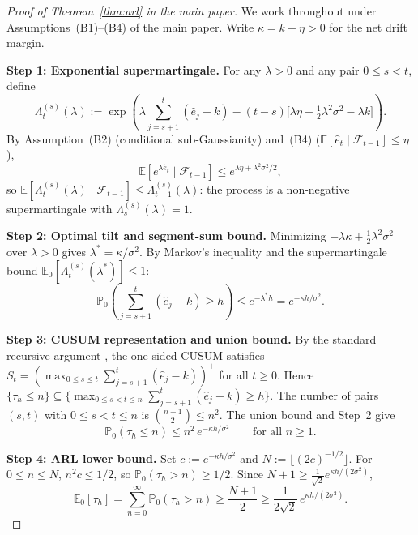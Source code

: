 \documentclass[bj,authoryear]{imsart}
\theoremstyle{plain}
\theoremstyle{definition}
\newcommand{\E}{\mathbb{E}}
\newcommand{\Prob}{\mathbb{P}}
\newcommand{\F}{\mathcal{F}}
\newcommand{\given}{\mid}
\begin{document}
\begin{proof}[Proof of Theorem~\ref{thm:arl} in the main paper]
  We work throughout under Assumptions~(B1)--(B4) of the main paper.
  Write $\kappa = k - \eta > 0$ for the net drift margin.

  \textbf{Step 1: Exponential supermartingale.}
  For any $\lambda > 0$ and any pair $0 \leq s < t$, define
  \[
    \Lambda_t^{(s)}(\lambda)
    := \exp\!\left(\lambda\sum_{j=s+1}^{t}(\hat{e}_j - k)
        - (t-s)\bigl[\lambda\eta + \tfrac{1}{2}\lambda^2\sigma^2
                      - \lambda k\bigr]\right).
  \]
  By Assumption~(B2) (conditional sub-Gaussianity) and~(B4)
  ($\E[\hat{e}_t\given\F_{t-1}] \leq \eta$),
  \[
    \E\!\left[e^{\lambda\hat{e}_t}\given\F_{t-1}\right]
    \leq e^{\lambda\eta + \lambda^2\sigma^2/2},
  \]
  so $\E[\Lambda_t^{(s)}(\lambda)\given\F_{t-1}] \leq \Lambda_{t-1}^{(s)}(\lambda)$:
  the process is a non-negative supermartingale with $\Lambda_s^{(s)}(\lambda) = 1$.

  \textbf{Step 2: Optimal tilt and segment-sum bound.}
  Minimizing $-\lambda\kappa + \tfrac{1}{2}\lambda^2\sigma^2$ over $\lambda > 0$
  gives $\lambda^* = \kappa/\sigma^2$.  By Markov's inequality and the
  supermartingale bound $\E_0[\Lambda_t^{(s)}(\lambda^*)] \leq 1$:
  \[
    \Prob_0\!\left(\sum_{j=s+1}^t(\hat{e}_j - k) \geq h\right)
    \leq e^{-\lambda^*h} = e^{-\kappa h/\sigma^2}.
  \]

  \textbf{Step 3: CUSUM representation and union bound.}
  By the standard recursive argument \citep[p.~20]{siegmund1985sequential}, the one-sided CUSUM satisfies
  $S_t = (\max_{0\leq s\leq t}\sum_{j=s+1}^t(\hat{e}_j-k))^+$ for all $t\geq 0$.
  Hence $\{\tau_h \leq n\} \subseteq \{\max_{0 \leq s < t \leq n}
  \sum_{j=s+1}^t (\hat{e}_j - k) \geq h\}$.
  The number of pairs $(s, t)$ with $0 \leq s < t \leq n$ is $\binom{n+1}{2} \leq n^2$.
  The union bound and Step~2 give
  \begin{equation}
    \Prob_0(\tau_h \leq n)
    \leq n^2\,e^{-\kappa h/\sigma^2}
    \qquad \text{for all }n \geq 1.
    \label{eq:supp-pbound}
  \end{equation}

  \textbf{Step 4: ARL lower bound.}
  Set $c := e^{-\kappa h/\sigma^2}$ and $N := \lfloor (2c)^{-1/2}\rfloor$.
  For $0 \leq n \leq N$, $n^2 c \leq 1/2$, so $\Prob_0(\tau_h > n) \geq 1/2$.
  Since $N+1 \geq \tfrac{1}{\sqrt{2}}e^{\kappa h/(2\sigma^2)}$,
  \[
    \E_0[\tau_h]
    = \sum_{n=0}^{\infty} \Prob_0(\tau_h > n)
    \geq \frac{N+1}{2}
    \geq \frac{1}{2\sqrt{2}}\,e^{\kappa h/(2\sigma^2)}.
  \]
\end{proof}
\end{document}
